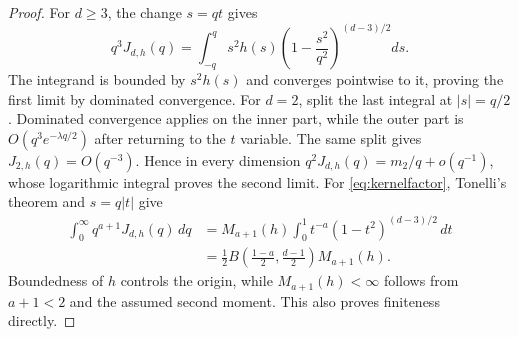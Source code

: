 \documentclass[11pt]{article}
\begin{document}
\begin{proof}
For $d\ge3$, the change $s=qt$ gives
\[
 q^3J_{d,h}(q)=\int_{-q}^q s^2h(s)
 \left(1-\frac{s^2}{q^2}\right)^{(d-3)/2}ds.
\]
The integrand is bounded by $s^2h(s)$ and converges pointwise to it, proving the first limit by dominated
convergence.  For $d=2$, split the last integral at $|s|=q/2$.  Dominated convergence applies on the inner
part, while the outer part is $O(q^3e^{-\lambda q/2})$ after returning to the $t$ variable.  The same split gives
$J_{2,h}(q)=O(q^{-3})$.  Hence in every dimension $q^2J_{d,h}(q)=m_2/q+o(q^{-1})$, whose logarithmic integral proves the second limit.
For \eqref{eq:kernelfactor}, Tonelli's theorem and $s=q|t|$ give
\begin{align*}
 \int_0^\infty q^{a+1}J_{d,h}(q)\,dq
 &=M_{a+1}(h)\int_0^1t^{-a}(1-t^2)^{(d-3)/2}\,dt\\
 &=\frac12B\!\left(\frac{1-a}{2},\frac{d-1}{2}\right)M_{a+1}(h).
\end{align*}
Boundedness of $h$ controls the origin, while $M_{a+1}(h)<\infty$ follows from $a+1<2$ and the assumed
second moment.  This also proves finiteness directly.
\end{proof}
\end{document}
